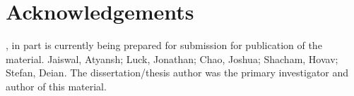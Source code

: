 \section{Acknowledgements}
\label{sec:acknowledgement-saber}
, in part is currently being prepared for submission for
publication of the material. Jaiswal, Atyansh; Luck, Jonathan; Chao, Joshua;
Shacham, Hovav; Stefan, Deian. The dissertation/thesis author was the primary
investigator and author of this material.
